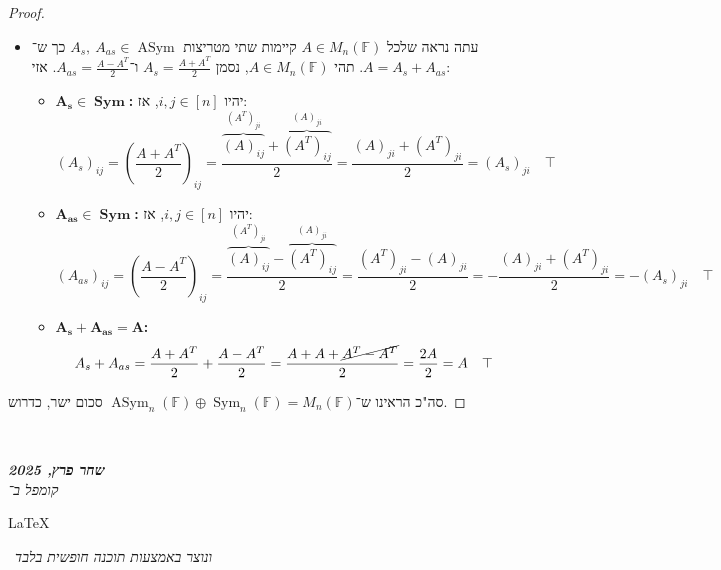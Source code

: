 \documentclass[]{article}
\newcommand\en[1] {\begin{otherlanguage}{english}#1\end{otherlanguage}}
\newcommand\ndoc  {\dotfill \\ \vfil {\begin{center}
            {\textbf{\textit{שחר פרץ, 2025}} \\
                \scriptsize \textit{קומפל ב־}\en{\LaTeX}\,\textit{ ונוצר באמצעות תוכנה חופשית בלבד}}
    \end{center}} \vfil	}
\DeclareMathOperator{\Sym}     {Sym}
\DeclareMathOperator{\Asym}    {ASym}
\newcommand\F         {\mathbb{F}}
\newcommand\cl [1]    {\left ( #1 \right )}
\theoremstyle{definition}
\newcommand\ASym      {\Asym}
\begin{document}
\begin{proof}
\begin{itemize}
        \item עתה נראה שלכל $A \in M_n(\F)$ קיימות שתי מטריצות $A_s, \ A_{as} \in \ASym$ כך ש־$A = A_s + A_{as}$. 
            תהי $A \in M_n(\F)$, נסמן $A_s = \frac{A + A^T}{2}$ ו־$A_{as} = \frac{A - A^T}{2}$. אזי: 
            \begin{itemize}
                \item $\bm{A_s \in \Sym}$\textbf{: }יהיו $i, j \in [n]$, אז: 
                \[ (A_s)_{ij} = \cl{\frac{A + A^T}{2}}_{ij} = \frac{\overbrace{(A)_{ij}}^{(A^T)_{ji}} + \overbrace{(A^T)_{ij}}^{(A)_{ji}}}{2} = \frac{(A)_{ji} + (A^T)_{ji}}{2} = (A_s)_{ji} \quad \top \]
                \item $\bm{A_{as} \in \Sym}$\textbf{: }יהיו $i, j \in [n]$, אז: 
                \[ (A_{as})_{ij} = \cl{\frac{A - A^T}{2}}_{ij} = \frac{\overbrace{(A)_{ij}}^{(A^T)_{ji}} - \overbrace{(A^T)_{ij}}^{(A)_{ji}}}{2} = \frac{(A^T)_{ji} - (A)_{ji}}{2} = -\frac{(A)_{ji} + (A^T)_{ji}}{2} = -(A_s)_{ji} \quad \top \]
                \item $\bm{A_s + A_{as} = A}$\textbf{: }
                \[ A_s + A_{as} = \frac{A + A^T}{2} + \frac{A - A^T}{2} = \frac{A + A + \cancel{A^T - A^T}}{2} = \frac{2A}{2} = A \quad \top \]
            \end{itemize}
        
    \end{itemize}
    סה"כ הראינו ש־$\ASym_n(\F) \oplus \Sym_n(\F) = M_n(\F)$ סכום ישר, כדרוש. 
    \end{proof}
    
    
    \ndoc
\end{document}
